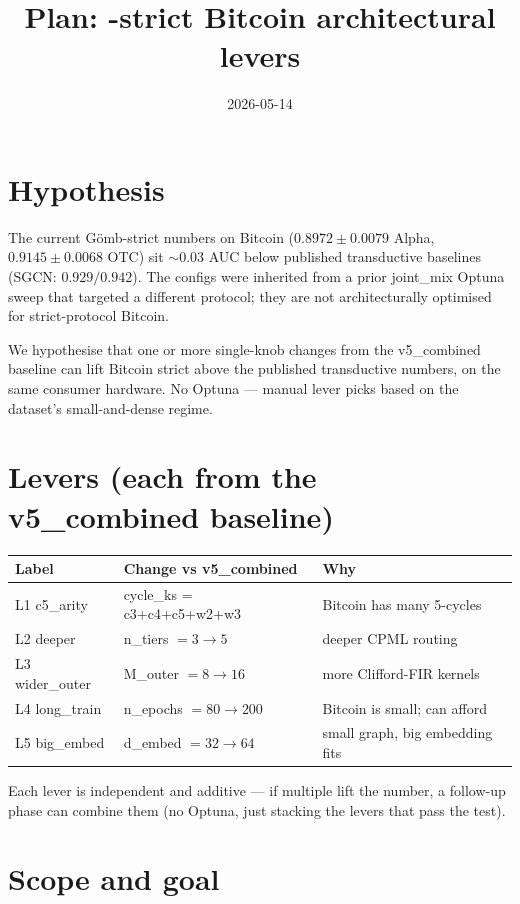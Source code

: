 \documentclass[11pt,a4paper]{article}
\title{Plan: \Gomb-strict Bitcoin architectural levers}
\date{2026-05-14}
\author{}
\newcommand{\Gomb}{G\"omb}
\begin{document}
\maketitle

\section{Hypothesis}

The current \Gomb-strict numbers on Bitcoin
($0.8972 \pm 0.0079$ Alpha, $0.9145 \pm 0.0068$ OTC) sit
$\sim 0.03$ AUC below published transductive baselines
(SGCN: $0.929 / 0.942$). The configs were inherited from a prior
joint\_mix Optuna sweep that targeted a different protocol; they
are not architecturally optimised for strict-protocol Bitcoin.

We hypothesise that one or more single-knob changes from the
v5\_combined baseline can lift Bitcoin strict above the published
transductive numbers, on the same consumer hardware. No Optuna ---
manual lever picks based on the dataset's small-and-dense regime.

\section{Levers (each from the v5\_combined baseline)}

\begin{center}
\begin{tabular}{lll}
\toprule
Label & Change vs v5\_combined & Why \\
\midrule
L1 c5\_arity   & cycle\_ks = c3+c4+c5+w2+w3        & Bitcoin has many 5-cycles \\
L2 deeper      & n\_tiers $= 3 \to 5$                & deeper CPML routing \\
L3 wider\_outer & M\_outer $= 8 \to 16$               & more Clifford-FIR kernels \\
L4 long\_train & n\_epochs $= 80 \to 200$            & Bitcoin is small; can afford \\
L5 big\_embed  & d\_embed $= 32 \to 64$              & small graph, big embedding fits \\
\bottomrule
\end{tabular}
\end{center}

Each lever is independent and additive --- if multiple lift the
number, a follow-up phase can combine them (no Optuna, just
stacking the levers that pass the test).

\section{Scope and goal}
\end{document}
